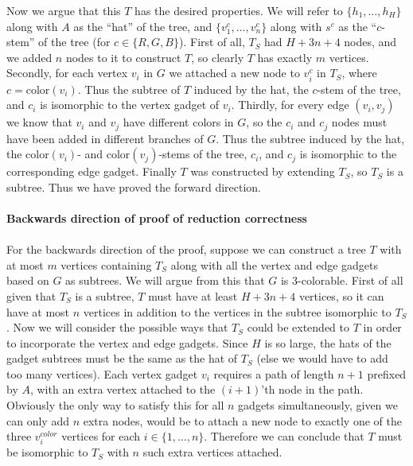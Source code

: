 Now we argue that this $T$ has the desired properties.
We will refer to $\{h_1,\ldots,h_H\}$ along with $A$
as the ``hat'' of the tree, and $\{v_1^c,\ldots,v_n^c\}$ along
with $s^c$ as the ``$c$-stem'' of the tree (for $c \in \{R, G, B\}$).
First of all, $T_S$ had $H + 3n + 4$ nodes, and we 
added $n$ nodes to it to construct $T$, so clearly $T$
has exactly $m$ vertices.
Secondly, for each vertex $v_i$ in $G$ we attached a new node to
$v_i^c$ in $T_S$, where $c = \text{color}(v_i)$.
Thus the subtree of $T$ induced by the hat, the $c$-stem
of the tree, and $c_i$ is isomorphic to the vertex gadget
of $v_i$. Thirdly, for every edge $(v_i, v_j)$ we know
that $v_i$ and $v_j$ have different colors in $G$, so
the $c_i$ and $c_j$ nodes must have been added in different
branches of $G$. Thus the subtree induced by the hat,
the $\text{color}(v_i)$- and $\text{color}(v_j)$-stems of the
tree, $c_i$, and $c_j$ is isomorphic to the corresponding
edge gadget. Finally $T$ was constructed by extending $T_S$,
so $T_S$ is a subtree. Thus we have proved the forward
direction.\\
\\
{\bf Backwards direction of proof of reduction correctness}\\
\\
For the backwards direction of the proof, suppose we can
construct a tree $T$ with at most $m$ vertices containing
$T_S$ along with all the vertex and edge gadgets based on
$G$ as subtrees. We will argue from this that $G$ is 3-colorable.
First of all given that $T_S$ is a subtree, $T$ must have at least
$H + 3n + 4$ vertices, so it can have at most $n$ vertices
in addition to the vertices in the subtree isomorphic to $T_S$.
Now we will consider the possible ways that $T_S$ could be
extended to $T$ in order to incorporate the vertex and
edge gadgets. Since $H$ is so large, the hats of the gadget
subtrees must be the same as the hat of $T_S$ (else we would
have to add too many vertices).
Each vertex gadget $v_i$ requires
a path of length $n + 1$ prefixed by $A$, with an extra vertex
attached to the $(i+1)$'th node in the path. Obviously the
only way to satisfy this for all $n$ gadgets simultaneously,
given we can only add $n$ extra nodes,
would be to attach a new node to exactly one
of the three $v_i^{color}$ vertices for each
$i \in \{1,\ldots,n\}$. Therefore we can conclude that $T$
must be isomorphic to $T_S$ with $n$ such extra vertices attached.

